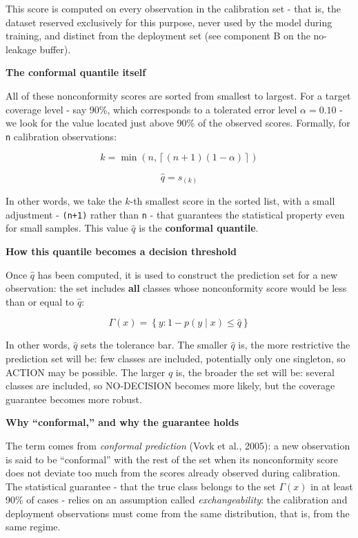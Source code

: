 This score is computed on every observation in the calibration set - that is, the dataset reserved exclusively for this purpose, never used by the model during training, and distinct from the deployment set (see component B on the no-leakage buffer).

\textbf{The conformal quantile itself}

All of these nonconformity scores are sorted from smallest to largest. For a target coverage level - say 90\%, which corresponds to a tolerated error level \(\alpha=0.10\) - we look for the value located just above 90\% of the observed scores. Formally, for \passthrough{\lstinline!n!} calibration observations:

\[
k=\min\left(n,\left\lceil(n+1)(1-\alpha)\right\rceil\right)
\]

\[
\hat q=s_{(k)}
\]

In other words, we take the \(k\)-th smallest score in the sorted list, with a small adjustment - \passthrough{\lstinline!(n+1)!} rather than \passthrough{\lstinline!n!} - that guarantees the statistical property even for small samples. This value \(\hat q\) is the \textbf{conformal quantile}.

\textbf{How this quantile becomes a decision threshold}

Once \(\hat q\) has been computed, it is used to construct the prediction set for a new observation: the set includes \textbf{all} classes whose nonconformity score would be less than or equal to \(\hat q\):

\[
\Gamma(x)=\left\{y:1-p(y\mid x)\leq\hat q\right\}
\]

In other words, \(\hat q\) sets the tolerance bar. The smaller \(\hat q\) is, the more restrictive the prediction set will be: few classes are included, potentially only one singleton, so ACTION may be possible. The larger \(\hat q\) is, the broader the set will be: several classes are included, so NO-DECISION becomes more likely, but the coverage guarantee becomes more robust.

\textbf{Why ``conformal,'' and why the guarantee holds}

The term comes from \emph{conformal prediction} (Vovk et al., 2005): a new observation is said to be ``conformal'' with the rest of the set when its nonconformity score does not deviate too much from the scores already observed during calibration. The statistical guarantee - that the true class belongs to the set \(\Gamma(x)\) in at least 90\% of cases - relies on an assumption called \emph{exchangeability}: the calibration and deployment observations must come from the same distribution, that is, from the same regime.

